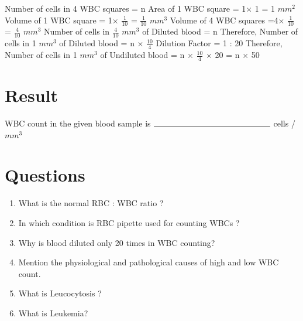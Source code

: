 \documentclass[a4paper,12pt,openany,oneside]{book}
\begin{document}
					Number of cells in 4 WBC squares = n\newline\vspace{.2cm}
					Area of 1 WBC square = 	1$\times$ 1 	= 1 $mm^2$\newline\vspace{.2cm}
					Volume of 1 WBC square	= 1$\times$ $\frac{1}{10}$ = $\frac{1}{10}$ $mm^3$\newline\vspace{.2cm}
					Volume of 4 WBC squares =4$\times$ $\frac{1}{10}$ = $\frac{4}{10}$ $mm^3$\newline\vspace{.2cm}
					Number of cells in $\frac{4}{10}$ $mm^3$ of Diluted blood 	= n \newline\vspace{.2cm}
					Therefore, Number of cells in 1 $mm^3$ of Diluted blood = 	n $\times$ $\frac{10}{4}$\newline\vspace{.2cm}
					Dilution Factor = 1 : 20\newline\vspace{.2cm}
					Therefore, Number of cells in 1 $mm^3$ of Undiluted blood 	= n $\times$ $\frac{10}{4}$ $\times$ 20 =	n $\times$ 50\newline\vspace{.2cm}


					\section *{Result}

					WBC count in the given  blood sample is $\rule{5cm}{0.5pt}$ cells / $mm^3$

					\section*{Questions}


					\begin{enumerate}

						\item{What is the normal RBC : WBC ratio ?}
						\item{ In which condition is RBC pipette used for counting WBCs ?}
						\item{ Why is blood diluted only 20 times in WBC counting?}
						\item{ Mention the physiological and pathological causes of high and low WBC count.}
						\item{ What is Leucocytosis ?}
						\item{ What is Leukemia?}
					\end{enumerate}
\end{document}
